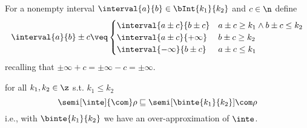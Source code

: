 \begin{definition}\label{def:sumbound}
  For a nonempty interval \(\interval{a}{b} \in \bInt{k_1}{k_2}\) and
  \(c \in \n\) define
  \begin{equation*}
    \interval{a}{b} \pm c \veq \begin{cases}
      \interval{a\pm c}{b\pm c} & a \pm c \geq k_1 \land b \pm c \leq k_2 \\
      \interval{a\pm c}{+\infty} & b \pm c \geq k_2 \\
      \interval{-\infty}{b \pm c} & a \pm c \leq k_1
    \end{cases}
  \end{equation*}
  recalling that \(\pm \infty + c = \pm\infty - c = \pm\infty\).
\end{definition}

\begin{lemma}\label{le:leq}
  for all \(k_1, k_2\in\z\) s.t. \(k_1 \leq k_2\)
  \begin{equation*}
    \semi[\inte]{\com}\rho \sqsubseteq \semi[\binte{k_1}{k_2}]{\com}\rho
  \end{equation*}
  i.e., with \(\binte{k_1}{k_2}\) we have an over-approximation of \(\inte\).
\end{lemma}

